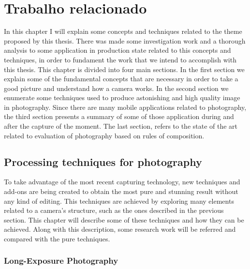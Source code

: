 \chapter{Trabalho relacionado}
\label{cha:related_work}
In this chapter I will explain some concepts and techniques related to the theme proposed by this thesis.
There was made some investigation work and a thorough analysis to some application in production state related to this concepts and techniques, in order to fundament the work that we intend to accomplish with this thesis.
This chapter is divided into four main sections. In the first section we explain some of the fundamental concepts that are necessary in order to take a good picture and understand how a camera works. In the second section we enumerate some techniques used to produce astonishing and high quality image in photography. Since there are many mobile applications related to photography, the third section presents a summary of some of those application during and after the capture of the moment. The last section, refers to the state of the art related to evaluation of photography based on rules of composition.

\section{Processing techniques for photography}
\label{sub:photo_techniques}

To take advantage of the most recent capturing technology, new techniques and add-ons are being created to obtain the most pure and stunning result without any kind of editing. This techniques are achieved by exploring many elements related to a camera’s structure, such as the ones described in the previous section. This chapter will describe some of these techniques and how they can be achieved. Along with this description, some research work will be referred and compared with the pure techniques.


\subsection{Long-Exposure Photography}

